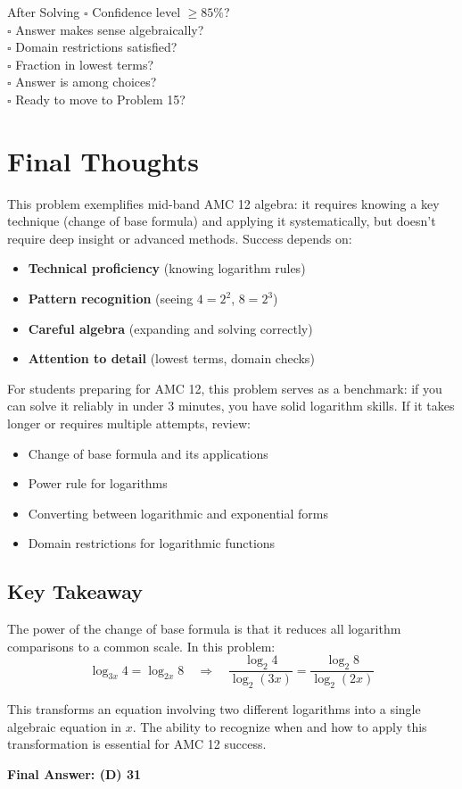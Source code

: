\documentclass[12pt]{article}
\begin{document}
\begin{competitionbox}
\begin{highlightbox}{After Solving}
$\square$ Confidence level $\geq 85\%$?\\
$\square$ Answer makes sense algebraically?\\
$\square$ Domain restrictions satisfied?\\
$\square$ Fraction in lowest terms?\\
$\square$ Answer is among choices?\\
$\square$ Ready to move to Problem 15?
\end{highlightbox}

\section*{Final Thoughts}

This problem exemplifies mid-band AMC 12 algebra: it requires knowing a key technique (change of base formula) and applying it systematically, but doesn't require deep insight or advanced methods. Success depends on:

\begin{itemize}
    \item \textbf{Technical proficiency} (knowing logarithm rules)
    \item \textbf{Pattern recognition} (seeing $4 = 2^2$, $8 = 2^3$)
    \item \textbf{Careful algebra} (expanding and solving correctly)
    \item \textbf{Attention to detail} (lowest terms, domain checks)
\end{itemize}

For students preparing for AMC 12, this problem serves as a benchmark: if you can solve it reliably in under 3 minutes, you have solid logarithm skills. If it takes longer or requires multiple attempts, review:
\begin{itemize}
    \item Change of base formula and its applications
    \item Power rule for logarithms
    \item Converting between logarithmic and exponential forms
    \item Domain restrictions for logarithmic functions
\end{itemize}

\subsection*{Key Takeaway}

The power of the change of base formula is that it reduces all logarithm comparisons to a common scale. In this problem:
\[\log_{3x} 4 = \log_{2x} 8 \quad\Rightarrow\quad \frac{\log_2 4}{\log_2(3x)} = \frac{\log_2 8}{\log_2(2x)}\]

This transforms an equation involving two different logarithms into a single algebraic equation in $x$. The ability to recognize when and how to apply this transformation is essential for AMC 12 success.

\vspace{1em}
\noindent\textbf{Final Answer: (D) 31}

\end{competitionbox}
\end{document}
